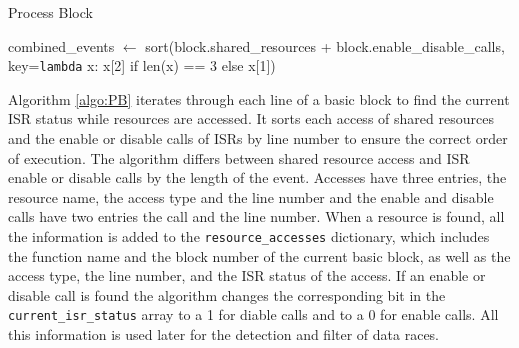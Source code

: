 \documentclass[
fancyheadings, %
%
%
]{stsreprt}
\begin{document}
{\begin{algorithm}[H]
	\caption{Process Block}
	\label{algo:PB}
	\DontPrintSemicolon
	\SetAlgoLined
	\BlankLine
	combined\_events $\gets$ sort(block.shared\_resources + block.enable\_disable\_calls, key=\texttt{lambda} x: x[2] if len(x) == 3 else x[1])\;
\end{algorithm}
\vspace{1cm}

Algorithm \ref{algo:PB} iterates through each line of a basic block to find the current \ac{ISR} status while resources are accessed. It sorts each access of shared resources and the enable or disable calls of \acp{ISR} by line number to ensure the correct order of execution. The algorithm differs between shared resource access and \Ac{ISR} enable or disable calls by the length of the event. Accesses have three entries, the resource name, the access type and the line number and the enable and disable calls have two entries the call and the line number. When a resource is found, all the information is added to the \texttt{resource\_accesses} dictionary, which includes the function name and the block number of the current basic block, as well as the access type, the line number, and the \ac{ISR} status of the access. If an enable or disable call is found the algorithm changes the corresponding bit in the \texttt{current\_isr\_status} array to a 1 for diable calls and to a 0 for enable calls. All this information is used later for the detection and filter of data races.

}
\end{document}
